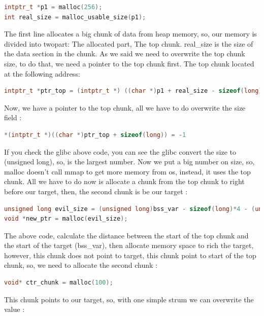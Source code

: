\documentclass{masterthesis}
\newcommand*\libc{glibc}
\begin{document}
\begin{lstlisting}[language=c,frame=tlrb]
intptr_t *p1 = malloc(256);
int real_size = malloc_usable_size(p1);
\end{lstlisting}

The first line allocates a big chunk of data from heap memory, so, our memory is divided into two\-part: The allocated part, The top chunk. real\_size is the size of the data section in the chunk. As we said we need to overwrite the top chunk size, to do that, we need a pointer to the top chunk first. The top chunk located at the following address: 

\begin{lstlisting}[language=c,frame=tlrb]
intptr_t *ptr_top = (intptr_t *) ((char *)p1 + real_size - sizeof(long));
\end{lstlisting}

Now, we have a pointer to the top chunk, all we have to do overwrite the size field :

\begin{lstlisting}[language=c,frame=tlrb]
*(intptr_t *)((char *)ptr_top + sizeof(long)) = -1
\end{lstlisting}

If you check the \libc{} above code, you can see the \libc{} convert the size to (unsigned long), so,  is the largest number. Now we put a big number on size, so, malloc doesn’t call mmap to get more memory from os, instead, it uses the top chunk. All we have to do now is allocate a chunk from the top chunk to right before our target, then, the second chunk is be our target :

\begin{lstlisting}[language=c,frame=tlrb]
unsigned long evil_size = (unsigned long)bss_var - sizeof(long)*4 - (unsigned long)ptr_top;
void *new_ptr = malloc(evil_size);
\end{lstlisting}

The above code, calculate the distance between the start of the top chunk and the start of the target (bss\_var), then allocate memory space to rich the target, however, this chunk does not point to target, this chunk point to start of the top chunk, so, we need to allocate the second chunk : 

\begin{lstlisting}[language=c,frame=tlrb]
void* ctr_chunk = malloc(100);
\end{lstlisting}

This chunk points to our target, so, with one simple strum we can overwrite the value :  
\end{document}
